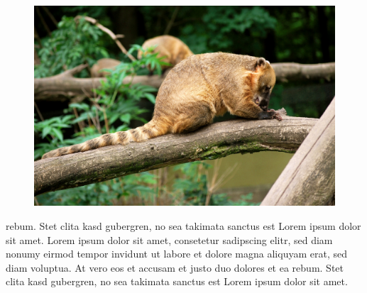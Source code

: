 \documentclass[a4paper]{scrreprt}
\begin{document}
\begin{figure}[h]
    \centering
    \includegraphics*[width=0.5\linewidth]{YourImage.jpg} 
\end{figure}
rebum. Stet clita kasd gubergren, no sea takimata sanctus est Lorem 
ipsum dolor sit amet. Lorem ipsum dolor sit amet, consetetur 
sadipscing elitr, sed diam nonumy eirmod tempor invidunt ut labore et
dolore magna aliquyam erat, sed diam voluptua. At vero eos et accusam
et justo duo dolores et ea rebum. Stet clita kasd gubergren, no sea 
takimata sanctus est Lorem ipsum dolor sit amet.
\end{document}
